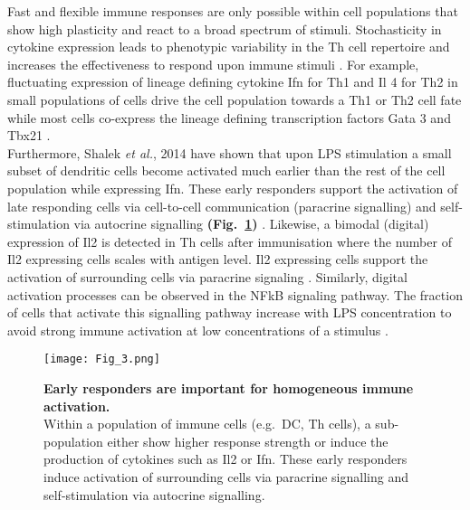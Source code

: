 Fast and flexible immune responses are only possible within cell populations that show high plasticity and react to a broad spectrum of stimuli. Stochasticity in cytokine expression leads to phenotypic variability in the \Gls{Th} cell repertoire and increases the effectiveness to respond upon immune stimuli \citep{Schrom2017}. For example, fluctuating expression of lineage defining cytokine \gls{Ifn}\textgamma{} for Th1 and \gls{Il} 4 for Th2 in small populations of cells drive the cell population towards a Th1 or Th2 cell fate while most cells co-express the lineage defining transcription factors \Gls{Gata} 3 and \Gls{Tbx21} \citep{Fang2013a, Antebi2013}.\\

Furthermore, Shalek \textit{et al.}, 2014 have shown that upon \gls{LPS} stimulation a small subset of dendritic cells become activated much earlier than the rest of the cell population while expressing \gls{Ifn}\textbeta. These early responders support the activation of late responding cells via cell-to-cell communication (paracrine signalling) and self-stimulation via autocrine signalling \textbf{(Fig.~\ref{fig0:noise_immune})} \citep{Shalek2014}. Likewise, a bimodal (digital) expression of Il2 is detected in \gls{Th} cells after immunisation where the number of Il2 expressing cells scales with antigen level. Il2 expressing cells support the activation of surrounding cells via paracrine signaling \citep{Fuhrmann2016}. Similarly, digital activation processes can be observed in the \gls{NFkB} signaling pathway. The fraction of cells that activate this signalling pathway increase with LPS concentration to avoid strong immune activation at low concentrations of a stimulus \citep{Kellogg2015b}.

\begin{figure}[!h]
\centering
\texttt{[image: Fig\_3.png]}
\caption[Early responders are important for homogeneous immune activation]{\textbf{Early responders are important for homogeneous immune activation.}\\
Within a population of immune cells (e.g.~\gls{DC}, \gls{Th} cells), a sub-population either show higher response strength or induce the production of cytokines such as \gls{Il}2 or \gls{Ifn}\textbeta. These early responders induce activation of surrounding cells via paracrine signalling and self-stimulation via autocrine signalling.}
\label{fig0:noise_immune}
\end{figure}

\vspace{-5mm}

